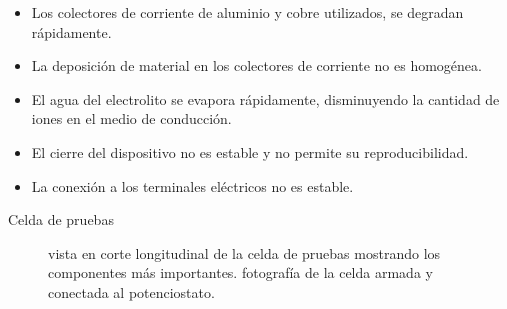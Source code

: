\documentclass{beamer}
\begin{document}
	\begin{frame}
		\begin{itemize}
			\item<1,6> Los colectores de corriente de aluminio y cobre utilizados, se degradan rápidamente.
			\item<2,6> La deposición de material en los colectores de corriente no es homogénea.
			\item<3,6> El agua del electrolito se evapora rápidamente, disminuyendo la cantidad de iones en el medio de conducción. 
			\item<4,6> El cierre del dispositivo no es estable y no permite su reproducibilidad.
			\item<5,6> La conexión a los terminales eléctricos no es estable.
		\end{itemize}
	\end{frame}

	\begin{frame}{Celda de pruebas}
		\begin{figure}[h!]
			\centering
			\caption[Celda de pruebas de supercondensador]{ vista en corte longitudinal de la celda de pruebas mostrando los componentes más importantes.  fotografía de la celda armada y conectada al potenciostato.}
			\label{fig:celda_de_pruebas_SC}
		\end{figure}
	\end{frame}
	
\end{document}
